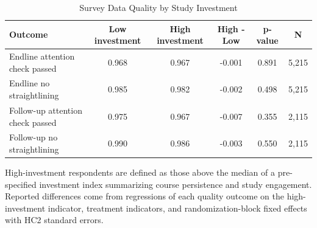 \begin{table}[H]
\centering
\caption{Survey Data Quality by Study Investment}
\label{tab:data_quality_by_investment}
\footnotesize
\begin{threeparttable}
\begin{tabular}{lccccc}
\toprule
Outcome & Low investment & High investment & High - Low & p-value & N \\
\midrule
Endline attention check passed & 0.968 & 0.967 & -0.001 & 0.891 & 5,215 \\
Endline no straightlining & 0.985 & 0.982 & -0.002 & 0.498 & 5,215 \\
Follow-up attention check passed & 0.975 & 0.967 & -0.007 & 0.355 & 2,115 \\
Follow-up no straightlining & 0.990 & 0.986 & -0.003 & 0.550 & 2,115 \\
\bottomrule
\end{tabular}
\begin{tablenotes}[flushleft]
\footnotesize
\item High-investment respondents are defined as those above the median of a pre-specified investment index summarizing course persistence and study engagement. Reported differences come from regressions of each quality outcome on the high-investment indicator, treatment indicators, and randomization-block fixed effects with HC2 standard errors.
\end{tablenotes}
\end{threeparttable}
\end{table}
